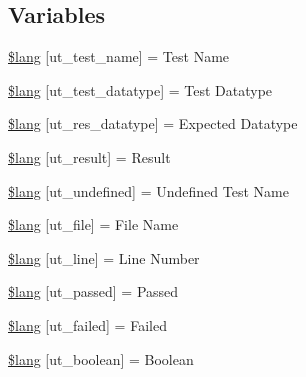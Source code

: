 \subsection*{Variables}
\begin{DoxyCompactItemize}
\item 
\hyperlink{unit__test__lang_8php_ad25baa7cab208cbe1fbe6f6913b0e18c}{\$lang} \mbox{[}\textquotesingle{}ut\+\_\+test\+\_\+name\textquotesingle{}\mbox{]} = \textquotesingle{}Test Name\textquotesingle{}
\item 
\hyperlink{unit__test__lang_8php_a141cfe44ef46b61362f161bc0cf220bc}{\$lang} \mbox{[}\textquotesingle{}ut\+\_\+test\+\_\+datatype\textquotesingle{}\mbox{]} = \textquotesingle{}Test Datatype\textquotesingle{}
\item 
\hyperlink{unit__test__lang_8php_a104083e98991c97a0ffa647a05541146}{\$lang} \mbox{[}\textquotesingle{}ut\+\_\+res\+\_\+datatype\textquotesingle{}\mbox{]} = \textquotesingle{}Expected Datatype\textquotesingle{}
\item 
\hyperlink{unit__test__lang_8php_a01f12785712ee32a97dc53d85e226993}{\$lang} \mbox{[}\textquotesingle{}ut\+\_\+result\textquotesingle{}\mbox{]} = \textquotesingle{}Result\textquotesingle{}
\item 
\hyperlink{unit__test__lang_8php_a08d38874ed86b9368f126d7597801077}{\$lang} \mbox{[}\textquotesingle{}ut\+\_\+undefined\textquotesingle{}\mbox{]} = \textquotesingle{}Undefined Test Name\textquotesingle{}
\item 
\hyperlink{unit__test__lang_8php_aadb1d48c93ccef9a1f4e61d529f8ee80}{\$lang} \mbox{[}\textquotesingle{}ut\+\_\+file\textquotesingle{}\mbox{]} = \textquotesingle{}File Name\textquotesingle{}
\item 
\hyperlink{unit__test__lang_8php_aee353ee43b856ce5ec790a20ea15ef92}{\$lang} \mbox{[}\textquotesingle{}ut\+\_\+line\textquotesingle{}\mbox{]} = \textquotesingle{}Line Number\textquotesingle{}
\item 
\hyperlink{unit__test__lang_8php_a7b1c16415de1186d294aa317d0bc864f}{\$lang} \mbox{[}\textquotesingle{}ut\+\_\+passed\textquotesingle{}\mbox{]} = \textquotesingle{}Passed\textquotesingle{}
\item 
\hyperlink{unit__test__lang_8php_a3aefecf7c98bec69d7957cbb673a3f49}{\$lang} \mbox{[}\textquotesingle{}ut\+\_\+failed\textquotesingle{}\mbox{]} = \textquotesingle{}Failed\textquotesingle{}
\item 
\hyperlink{unit__test__lang_8php_aa274bf9371c9922bc530135b4dc45943}{\$lang} \mbox{[}\textquotesingle{}ut\+\_\+boolean\textquotesingle{}\mbox{]} = \textquotesingle{}Boolean\textquotesingle{}

\end{DoxyCompactItemize}
